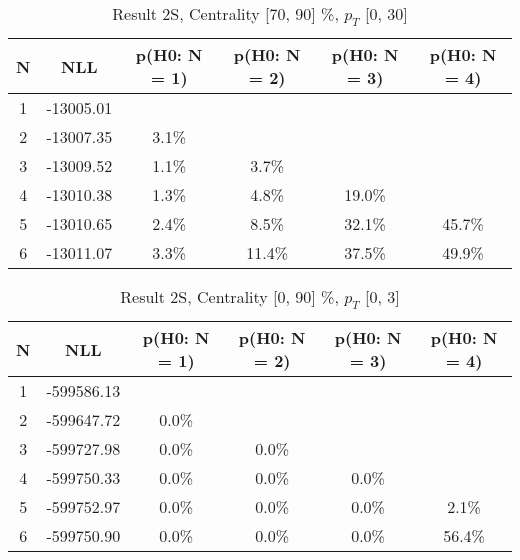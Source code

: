 \begin{table}[htb]
	\begin{center}
	\caption{Result 2S, Centrality [70, 90] \%, $p_{T}$ [0, 30] \GeV
}
{\footnotesize\renewcommand{\arraystretch}{1.4}
		\begin{tabular}{cc||cc>{\columncolor[gray]{0.8}}cc}
			N & NLL & p(H0: N = 1) & p(H0: N = 2) & p(H0: N = 3) & p(H0: N = 4)\\ 
		\hline
1 & -13005.01 & & & &\\
2 & -13007.35 & 3.1\% & & &\\
3 & -13009.52 & 1.1\% & 3.7\% & &\\
4 & -13010.38 & 1.3\% & 4.8\% & 19.0\% &\\
5 & -13010.65 & 2.4\% & 8.5\% & 32.1\% & 45.7\%\\
6 & -13011.07 & 3.3\% & 11.4\% & 37.5\% & 49.9\% \\
	\end{tabular}
		\label{tab:lab}
	}
	\end{center}\end{table}

\begin{table}[htb]
	\begin{center}
	\caption{Result 2S, Centrality [0, 90] \%, $p_{T}$ [0, 3] \GeV
}
{\footnotesize\renewcommand{\arraystretch}{1.4}
		\begin{tabular}{cc||cccc}
			N & NLL & p(H0: N = 1) & p(H0: N = 2) & p(H0: N = 3) & p(H0: N = 4)\\ 
		\hline
1 & -599586.13 & & & &\\
2 & -599647.72 & 0.0\% & & &\\
3 & -599727.98 & 0.0\% & 0.0\% & &\\
4 & -599750.33 & 0.0\% & 0.0\% & 0.0\% &\\
5 & -599752.97 & 0.0\% & 0.0\% & 0.0\% & 2.1\%\\
6 & -599750.90 & 0.0\% & 0.0\% & 0.0\% & 56.4\% \\
	\end{tabular}
		\label{tab:lab}
	}
	\end{center}\end{table}

